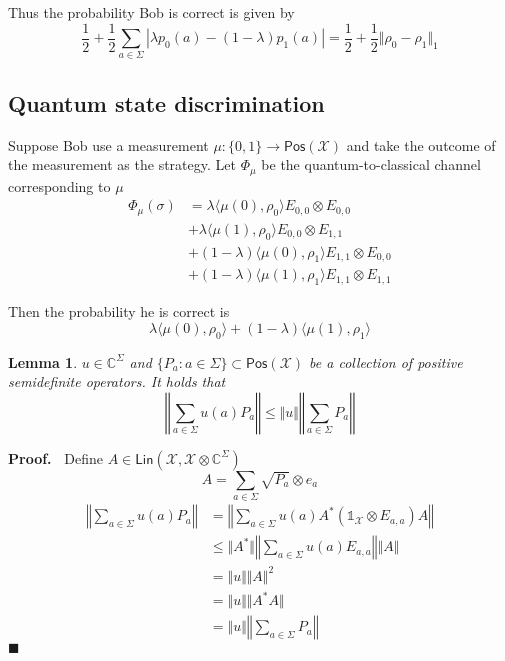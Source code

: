 \documentclass[aps,pra,onecolumn,notitlepage,superscriptaddress]{revtex4-1}
\newcommand{\C}{\mathbb{C}}
\newcommand{\spc}[1]{\mathcal{#1}}
\newcommand{\Lin}{\mathsf{Lin}}
\newcommand{\Pos}{\mathsf{Pos}}
\def\>{\rangle}
\def\<{\langle}
\newcommand\I{\mathds{1}}
\newtheorem{lemma}{Lemma}
\def\Proof{{\bf Proof.~}}
\def\qed{$\blacksquare$ \newline}
\begin{document}
    Thus the probability Bob is correct is given by
    \begin{equation}
        \frac{1}{2} + \frac{1}{2}\sum_{a \in \Sigma} |\lambda p_0(a) - (1-\lambda) p_1(a)| = \frac{1}{2} + \frac{1}{2} \Vert \rho_0 - \rho_1 \Vert_1
    \end{equation} 

    \subsection{Quantum state discrimination}
    Suppose Bob use a measurement $\mu : \{0,1\} \to \Pos(\spc X)$ and take the outcome of the measurement as the strategy. Let $\Phi_\mu$ be the quantum-to-classical channel corresponding to $\mu$
    \begin{align*}
        \Phi_\mu(\sigma)
        &= \lambda \< \mu(0), \rho_0 \> E_{0,0} \otimes E_{0,0} \\
        &+ \lambda \< \mu(1), \rho_0 \> E_{0,0} \otimes E_{1,1} \\
        &+ (1-\lambda) \< \mu(0), \rho_1 \> E_{1,1} \otimes E_{0,0} \\
        &+ (1-\lambda) \< \mu(1), \rho_1 \> E_{1,1} \otimes E_{1,1}
    \end{align*}
    
    Then the probability he is correct is
    \begin{equation}
        \lambda \< \mu(0), \rho_0 \> + (1-\lambda) \< \mu(1), \rho_1 \>
    \end{equation}

    \begin{lemma}
        $u \in \C^{\Sigma}$ and $\{P_a : a \in \Sigma\} \subset \Pos(\spc{X})$ be a collection of positive semidefinite operators. It holds that
        \begin{equation}
            \left\Vert \sum_{a \in \Sigma} u(a) P_a \right\Vert \leq
            \Vert u \Vert \left\Vert \sum_{a \in \Sigma} P_a \right\Vert
        \end{equation}
    \end{lemma}
    \Proof {
        Define $A \in \Lin(\spc{X}, \spc{X} \otimes \C^{\Sigma})$
        \begin{equation}
            A = \sum_{a \in \Sigma} \sqrt{P_a} \otimes e_a
        \end{equation}
        \begin{align*}
            \left\Vert \sum_{a \in \Sigma} u(a) P_a \right\Vert
            &= \left\Vert \sum_{a \in \Sigma} u(a) A^*(\I_{\spc{X}} \otimes E_{a,a})A \right\Vert \\
            &\leq \Vert A^* \Vert \left\Vert \sum_{a \in \Sigma} u(a) E_{a,a} \right\Vert \Vert A \Vert \\
            &= \Vert u \Vert \Vert A \Vert^2 \\
            &= \Vert u \Vert \Vert A^*A \Vert \\
            &= \Vert u \Vert \left\Vert \sum_{a \in \Sigma} P_a \right\Vert 
        \end{align*}
    } \qed
\end{document}
